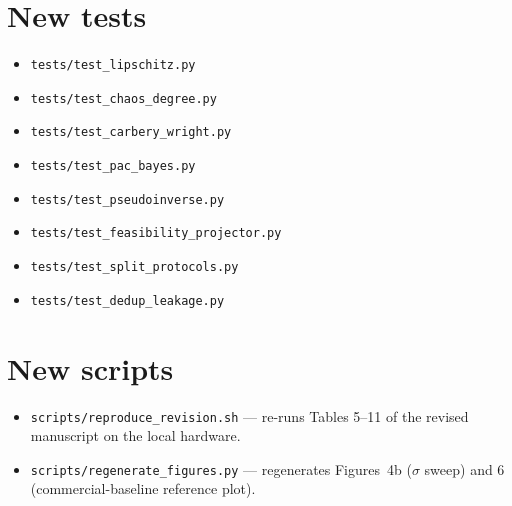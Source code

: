 \documentclass[11pt,letterpaper]{article}
\begin{document}
\section{New tests}
\begin{itemize}[leftmargin=1.4em]
  \item \texttt{tests/test\_lipschitz.py}
  \item \texttt{tests/test\_chaos\_degree.py}
  \item \texttt{tests/test\_carbery\_wright.py}
  \item \texttt{tests/test\_pac\_bayes.py}
  \item \texttt{tests/test\_pseudoinverse.py}
  \item \texttt{tests/test\_feasibility\_projector.py}
  \item \texttt{tests/test\_split\_protocols.py}
  \item \texttt{tests/test\_dedup\_leakage.py}
\end{itemize}

\section{New scripts}
\begin{itemize}[leftmargin=1.4em]
  \item \texttt{scripts/reproduce\_revision.sh} — re-runs Tables 5--11
        of the revised manuscript on the local hardware.
  \item \texttt{scripts/regenerate\_figures.py} — regenerates
        Figures~4b ($\sigma$ sweep) and 6 (commercial-baseline
        reference plot).
\end{itemize}
\end{document}
